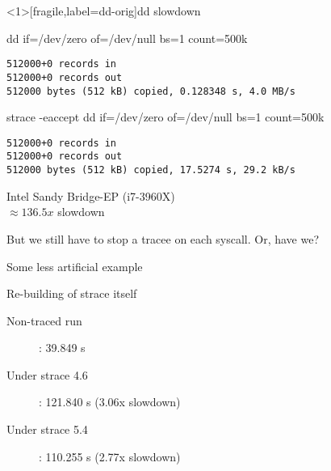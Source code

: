 \documentclass[unicode,aspectratio=169]{beamer}
\begin{document}
\begin{frame}<1>[fragile,label=dd-orig]{dd slowdown}
\begin{block}{\large dd if=/dev/zero of=/dev/null bs=1 count=500k}
\begin{verbatim}
512000+0 records in
512000+0 records out
512000 bytes (512 kB) copied, 0.128348 s, 4.0 MB/s
\end{verbatim}
\end{block}

\begin{block}{\large strace -eaccept dd if=/dev/zero of=/dev/null bs=1 count=500k}
\begin{verbatim}
512000+0 records in
512000+0 records out
512000 bytes (512 kB) copied, 17.5274 s, 29.2 kB/s
\end{verbatim}
\end{block}
\begin{scriptsize}
Intel Sandy Bridge-EP (i7-3960X) \\
$\approx 136.5x$ slowdown \\
\end{scriptsize}
\pause
But we still have to stop a tracee on each syscall. Or, have we?
\end{frame}

\begin{frame}[fragile]{Some less artificial example}
\begin{block}{\large Re-building of strace itself\footnotemark[1]}
\begin{description}
  \item[Non-traced run]: 39.849 s
  \item[Under strace 4.6]: 121.840 s (3.06x slowdown)
  \item[Under strace 5.4]: 110.255 s (2.77x slowdown)
\end{description}
\end{block}
\end{frame}

\end{document}
